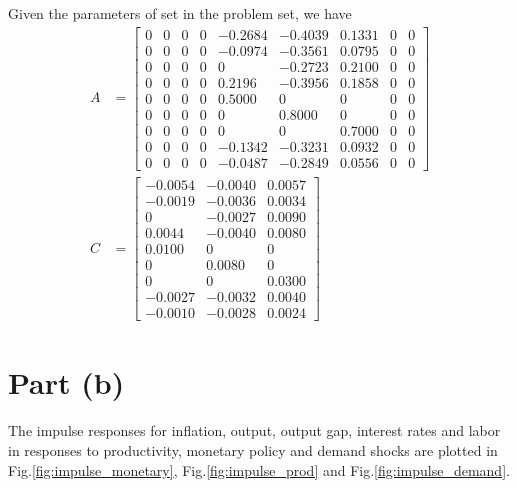 \documentclass[12pt]{article}
\theoremstyle{definition}
\newcommand{\bra}[1]{\left[#1\right]}
\newcommand{\mat}[1]{\begin{matrix}#1\end{matrix}}
\newcommand{\bmat}[1]{\bra{\mat{#1}}}
\begin{document}
Given the parameters of set in the problem set, we have
\begin{align*}
A &= \bmat{0  &  0        &0&   0&   -0.2684 &  -0.4039  &  0.1331 &   0 & 0\\
0   & 0       & 0 &  0 &  -0.0974 &  -0.3561  &  0.0795  & 0 &	0\\
0 &   0      &  0  & 0  & 0  & -0.2723   & 0.2100   & 0 &	0\\
0  &  0     &   0&   0 &  0.2196  & -0.3956   & 0.1858 &  0& 	0\\
0   & 0    &    0 &  0&    0.5000  & 0 &  0 &  0	&0\\
0 &   0   &     0  & 0 &  0  &  0.8000  &  0  & 0 &	0\\
0  &  0  &      0&   0  &  0  &  0 &   0.7000  &  0 	&0\\
0   & 0 &       0 &  0 &  -0.1342  & -0.3231  &  0.0932  &  0 &	0\\
0   & 0&        0  & 0  & -0.0487  & -0.2849 &   0.0556  & 0 &	0}\\
C & = \bmat{ -0.0054 &  -0.0040 &   0.0057\\
-0.0019  & -0.0036 &   0.0034\\
0  & -0.0027  &  0.0090\\
0.0044   &-0.0040 &   0.0080\\
0.0100   &0 &   0\\
0   & 0.0080   & 0\\
0   & 0 &   0.0300\\
-0.0027  & -0.0032  &  0.0040\\
-0.0010   &-0.0028 &   0.0024}
\end{align*}


\section*{Part (b)}

The impulse responses for inflation, output, output gap, interest rates and labor in responses to productivity, monetary policy and demand shocks are plotted in Fig.\ref{fig:impulse_monetary}, Fig.\ref{fig:impulse_prod} and Fig.\ref{fig:impulse_demand}.
\end{document}
